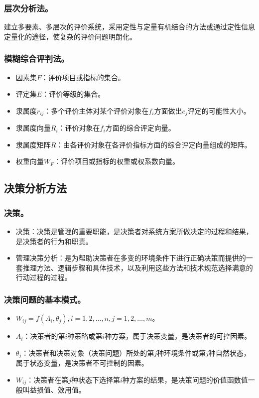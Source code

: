 \documentclass{article}
\begin{document}
\subsubsection{层次分析法。}
建立多要素、多层次的评价系统，采用定性与定量有机结合的方法或通过定性信息定量化的途径，使复杂的评价问题明朗化。

\subsubsection{模糊综合评判法。}
\begin{itemize}
    \item 因素集$F$：评价项目或指标的集合。
    \item 评定集$E$：评价等级的集合。
    \item 隶属度$r_{ij}$：多个评价主体对某个评价对象在$f_i$方面做出$e_j$评定的可能性大小。
    \item 隶属度向量$R_i$：评价对象在$f_i$方面的综合评定向量。
    \item 隶属度矩阵$R$：由各评价对象在各评价指标方面的综合评定向量组成的矩阵。
    \item 权重向量$W_F$：评价项目或指标的权重或权系数向量。
\end{itemize}

\subsection{决策分析方法}

\subsubsection{决策。}
\begin{itemize}
    \item 决策：决策是管理的重要职能，是决策者对系统方案所做决定的过程和结果，是决策者的行为和职责。
    \item 管理决策分析：是为帮助决策者在多变的环境条件下进行正确决策而提供的一套推理方法、逻辑步骤和具体技术，以及利用这些方法和技术规范选择满意的行动过程的过程。
\end{itemize}

\subsubsection{决策问题的基本模式。}
\begin{itemize}
    \item $W_{ij}=f(A_i,\theta_j),i=1,2,\ldots,n,j=1,2,\ldots,m$。
    \item $A_i$：决策者的第$i$种策略或第$i$种方案，属于决策变量，是决策者的可控因素。
    \item $\theta_j$：决策者和决策对象（决策问题）所处的第$j$种环境条件或第$j$种自然状态，属于状态变量，是决策者不可控制的因素。
    \item $W_{ij}$：决策者在第$j$种状态下选择第$i$种方案的结果，是决策问题的价值函数值一般叫益损值、效用值。
\end{itemize}
\end{document}
